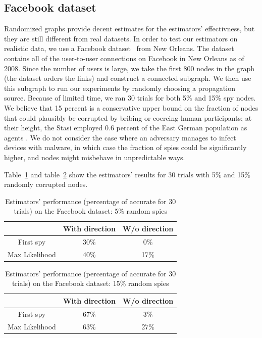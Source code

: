 \subsection{Facebook dataset}

Randomized graphs provide decent estimates for the estimators' effectivness, but they are still different from real datasets. In order to test our estimators on realistic data, we use a Facebook dataset~\cite{viswanath-2009-activity} from New Orleans. The dataset contains all of the user-to-user connections on Facebook in New Orleans as of 2008. Since the number of users is large, we take the first 800 nodes in the graph (the dataset orders the links) and construct a connected subgraph. We then use this subgraph to run our experiments by randomly choosing a propagation source. Because of limited time, we ran 30 trials for both 5\% and 15\% spy nodes. We believe that 15 percent is a conservative upper bound on the fraction of nodes that could plausibly be corrupted by bribing or coercing human participants; at their height, the Stasi employed 0.6 percent of the East German population as agents \cite{koehler1999stasi}. We do not consider the case where an adversary manages to infect devices with malware, in which case the fraction of spies could be significantly higher, and nodes might misbehave in unpredictable ways.

Table~\ref{table:fb:05} and table~\ref{table:fb:15} show the estimators' results for 30 trials with 5\% and 15\% randomly corrupted nodes. 

\begin{table}
\label{table:fb:05}
\begin{tabular}{c | c | c}
  & With direction & W/o direction \\
  \hline
  First spy & 30\% & 0\% \\ 
  Max Likelihood & 40\% & 17\% \\
\end{tabular}
\caption{Estimators' performance (percentage of accurate for 30 trials) on the Facebook dataset: 5\% random spies}
\end{table}


\begin{table}
\label{table:fb:15}
\begin{tabular}{c | c | c}
  & With direction & W/o direction \\
  \hline
  First spy & 67\% & 3\% \\ 
  Max Likelihood & 63\% & 27\% \\
\end{tabular}
\caption{Estimators' performance (percentage of accurate for 30 trials) on the Facebook dataset: 15\% random spies}
\end{table}
